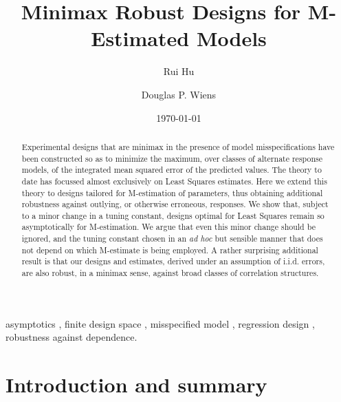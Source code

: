 \documentclass[times, authoryear, 12pt, twoside]{elsarticle}
\begin{document}
\def\T{{ \mathrm{\scriptscriptstyle T} }}

\date{\today }



\begin{frontmatter}
\title{Minimax Robust Designs for M-Estimated Models}

\author[A1]{Rui Hu}
\address[A1]{Mathematics \& Statistics,
	MacEwan University,
	Edmonton, Canada,  T5J 4S2}

\author[A2]{Douglas P. Wiens}
\address[A2]{Mathematical \& Statistical Sciences,
	University of Alberta,
	Edmonton, Canada,  T6G 2G1}


\begin{abstract}
Experimental designs that are minimax in the presence of
model misspecifications have been constructed so as to minimize the maximum,
over classes of alternate response models, of the integrated mean squared
error of the predicted values. The theory to date has focussed almost exclusively on Least Squares estimates. Here we extend this theory to designs tailored for M-estimation of parameters, thus obtaining additional robustness against outlying, or otherwise erroneous, responses. We show that, subject to a minor change in a tuning constant, designs optimal for Least Squares remain so asymptotically for M-estimation. We argue that even this minor change should be ignored, and the tuning constant chosen in an \textit{ad hoc} but sensible manner that does not depend on which M-estimate is being employed. A rather surprising additional result is that our designs and estimates, derived under an assumption of i.i.d. errors, are also robust, in a minimax sense, against broad classes of correlation structures.
\end{abstract}

\begin{keyword} %
asymptotics \sep
finite design space \sep
misspecified model \sep
regression design \sep
robustness against dependence. 
\end{keyword}
\end{frontmatter}

\section{Introduction and summary \label{section: intro}}
\end{document}

